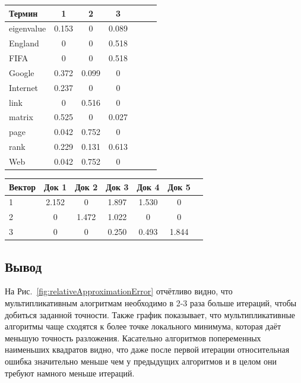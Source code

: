 \begin{center}
 \begin{tabular}{ l | c c c c c c }
 Термин      & 1 & 2 & 3 \\
 \hline
 eigenvalue  & 0.153  &   0  &   0.089 \\
 England     & 0  &   0  &   0.518 \\
 FIFA        & 0  &   0  &   0.518 \\
 Google      & 0.372  &   0.099  &   0 \\
 Internet    & 0.237  &   0  &   0 \\
 link        & 0  &   0.516  &   0 \\
 matrix      & 0.525  &  	0  &   0.027 \\
 page        & 0.042  &   0.752  &   0 \\
 rank        & 0.229  &   0.131  &   0.613 \\
 Web         & 0.042  &   0.752  &   0
\end{tabular}
\end{center}

\begin{center}
 \begin{tabular}{ l | c c c c c c }
 Вектор      & Док 1 & Док 2 & Док 3 & Док 4 & Док 5 \\
 \hline
 1           & 2.152  &   0  &   1.897  &   1.530  &  0 \\
 2           & 0  &   1.472  &   1.022  &   0  &   0 \\
 3           & 0  &   0  &   0.250  &   0.493  &   1.844 \\
\end{tabular}
\end{center}

\newpage

\subsection{Вывод}

На Рис.~\ref{fig:relativeApproximationError} отчётливо видно,
что мультипликативным алогритмам необходимо в 2-3 раза больше итераций, чтобы добиться заданной точности.
Также график показывает, что мультипликативные алгоритмы чаще сходятся к более  точке локального минимума,
которая даёт меньшую точность разложения.
Касательно алгоритмов попеременных наименьших квадратов видно, что даже после первой итерации
относительная ошибка значительно меньше чем у предыдущих алгоритмов и в целом они требуют намного меньше итераций.

